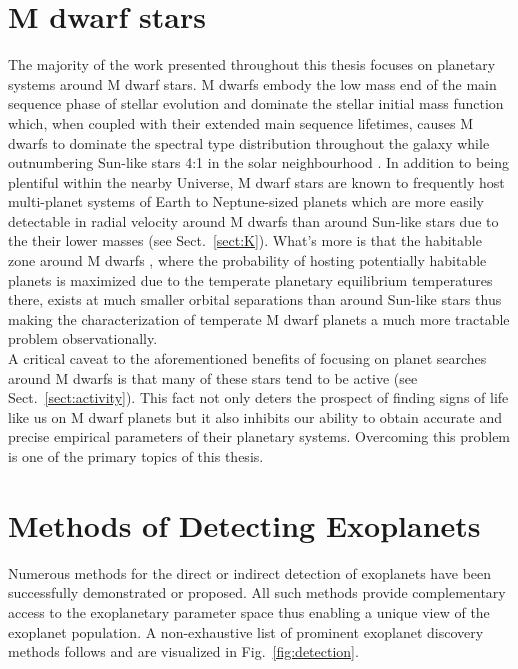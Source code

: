 \section{M dwarf stars} \label{sect:Mdwarfs}
The majority of the work presented throughout this thesis focuses on planetary systems
around M dwarf stars. M dwarfs embody the low mass end of the main sequence
phase of stellar evolution and dominate the stellar initial mass function
\citep{kroupa01} which, when
coupled with their extended main sequence lifetimes, causes M dwarfs to dominate the
spectral type distribution throughout the galaxy while outnumbering Sun-like stars
4:1 in the solar neighbourhood \citep{winters15}. In addition to being plentiful
within the nearby Universe, M dwarf stars are known to frequently host multi-planet
systems of Earth to Neptune-sized planets \citep{dressing15a,gaidos16} which
are more easily detectable in radial velocity around M dwarfs than around Sun-like stars
due to the their lower masses (see Sect.~\ref{sect:K}). What's more is that the habitable zone
around M dwarfs \citep{kasting93,kopparapu13}, where the probability of hosting potentially
habitable planets is maximized due to the temperate planetary equilibrium temperatures there,
exists at much smaller orbital separations than around Sun-like stars thus making the
characterization of temperate M dwarf planets a much more tractable problem observationally. \\

A critical caveat to the aforementioned benefits of focusing on planet searches around M dwarfs
is that many of these stars tend to be active (see Sect.~\ref{sect:activity}). This fact not only
deters the prospect of finding signs of life like us on M dwarf planets but it also inhibits
our ability to obtain accurate and precise empirical parameters of their planetary systems.
Overcoming this problem is one of the primary topics of this thesis.

  
\section{Methods of Detecting Exoplanets} \label{sect:detection}
Numerous methods for the direct or indirect detection of exoplanets
have been successfully demonstrated or proposed. All such methods provide complementary
access to the exoplanetary parameter space thus enabling a unique view of the exoplanet
population. A non-exhaustive list of prominent exoplanet discovery methods follows and are
visualized in Fig.~\ref{fig:detection}. \\

